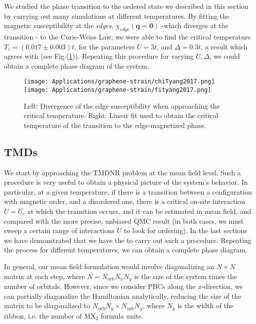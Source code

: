 We studied the phase transition to the ordered state we described in this section by carrying out many simulations at different temperatures.
By fitting the magnetic susceptibility at the \emph{edges}, $\chi_{edge} (\bm q = \bm 0)$ -which diverges at the transition - to the Curie-Weiss Law, we were able to find the critical temperature $T_c = (0.017 \pm 0.003) t$, for the parameters $U = 3 t$, and $\Delta = 0.3 t$, a result which agrees with \cite{yang_strain-tuning_2017} (see Fig.(\ref{fig:chiFit})).
Repeating this procedure for varying $U, \Delta$, we could obtain a complete phase diagram of the system.
\begin{figure}[H]
\hspace{0.2cm}
\texttt{[image: Applications/graphene-strain/chiTyang2017.png]}
\texttt{[image: Applications/graphene-strain/fityang2017.png]}
	\caption[Divergence of the edge susceptibility when approaching the critical temperature. Linear fit used to obtain the critical temperature of the transition to the edge-magnetized phase.]{Left: Divergence of the edge susceptibility when approaching the critical temperature. 
	Right: Linear fit used to obtain the critical temperature of the transition to the edge-magnetized phase.}
	\label{fig:chiFit}
\end{figure}

\subsection{\acp{TMD}}
\label{subsec:apTMD}

We start by approaching the \acs{TMDNR} problem at the mean field level.
Such a procedure is very useful to obtain a physical picture of the system's behavior.
In particular, at a given temperature, if there is a transition between a configuration with magnetic order, and a disordered one, there is a critical on-site interaction $U = U_c$ at which the transition occurs, and it can be estimated in mean field, and compared with the more precise, unbiased \acs{QMC} result (in both cases, we must sweep a certain range of interactions $U$ to look for ordering).
In the last sections we have demonstrated that we have the  to carry out such a procedure.
Repeating the process for different temperatures, we can obtain a complete phase diagram.

In general, our mean field formulation would involve diagonalizing an $N \times N$ matrix at each step, where $N = N_{\text{orb}} N_x N_y$ is the size of the system times the number of orbitals.
However, since we consider \acs{PBC}s along the $x$-direction, we can partially diagonalize  the Hamiltonian analytically, reducing the size of the matrix to be diagonalized to $N_{\text{orb}} N_y \times N_{\text{orb}} N_y$, where $N_y$ is the width of the ribbon, i.e. the number of $\text{M}\text{X}_2$ formula units.

